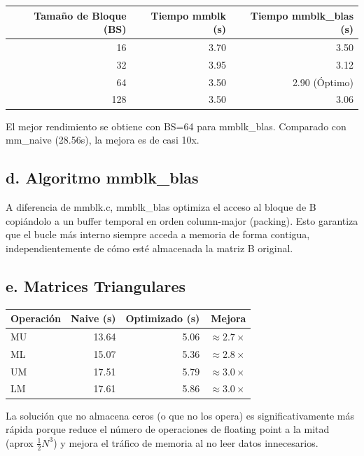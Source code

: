 \documentclass[11pt,a4paper]{article}
\begin{document}
\begin{center}
\begin{tabular}{|r|r|r|}
\hline
\textbf{Tamaño de Bloque (BS)} & \textbf{Tiempo mmblk (s)} & \textbf{Tiempo mmblk\_blas (s)} \\
\hline
16 & 3.70 & 3.50 \\
32 & 3.95 & 3.12 \\
64 & 3.50 & 2.90 (Óptimo) \\
128 & 3.50 & 3.06 \\
\hline
\end{tabular}
\end{center}

El mejor rendimiento se obtiene con BS=64 para mmblk\_blas. Comparado con mm\_naive (28.56s), la mejora es de casi 10x.

\subsection*{d. Algoritmo mmblk\_blas}

A diferencia de mmblk.c, mmblk\_blas optimiza el acceso al bloque de B copiándolo a un buffer temporal en orden column-major (packing). Esto garantiza que el bucle más interno siempre acceda a memoria de forma contigua, independientemente de cómo esté almacenada la matriz B original.

\subsection*{e. Matrices Triangulares}

\begin{center}
\begin{tabular}{|l|r|r|r|}
\hline
\textbf{Operación} & \textbf{Naive (s)} & \textbf{Optimizado (s)} & \textbf{Mejora} \\
\hline
MU & 13.64 & 5.06 & $\approx 2.7\times$ \\
ML & 15.07 & 5.36 & $\approx 2.8\times$ \\
UM & 17.51 & 5.79 & $\approx 3.0\times$ \\
LM & 17.61 & 5.86 & $\approx 3.0\times$ \\
\hline
\end{tabular}
\end{center}

La solución que no almacena ceros (o que no los opera) es significativamente más rápida porque reduce el número de operaciones de floating point a la mitad (aprox $\frac{1}{2} N^3$) y mejora el tráfico de memoria al no leer datos innecesarios.
\end{document}
